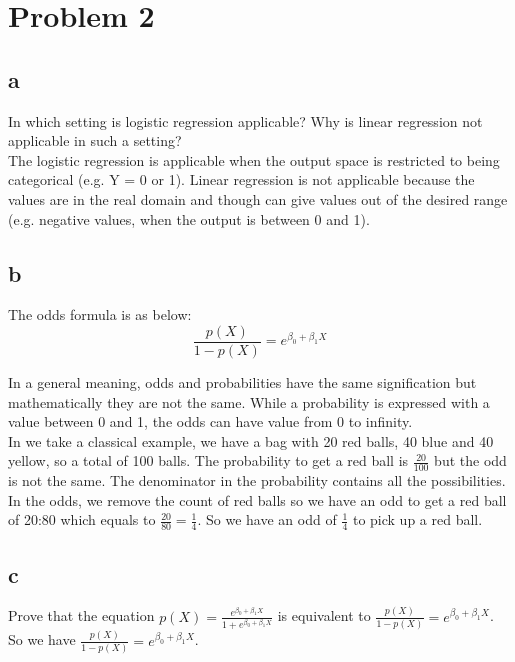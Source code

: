 \section*{Problem 2}

\subsection*{a}
In which setting is logistic regression applicable? Why is linear regression not applicable in such a setting?\\

The logistic regression is applicable when the output space is restricted to being categorical (e.g. Y = 0 or 1). Linear regression is not applicable because the values are in the real domain and though can give values out of the desired range (e.g. negative values, when the output is between 0 and 1). 

\subsection*{b}
The odds formula is as below: 
\[ \frac{p(X)}{1 - p(X)} = e^{\beta_0 + \beta_1 X} \]

In a general meaning, odds and probabilities have the same signification but mathematically they are not the same. While a probability is expressed with a value between 0 and 1, the odds can have value from 0 to infinity. \\

In we take a classical example, we have a bag with 20 red balls, 40 blue and 40 yellow, so a total of 100 balls. The probability to get a red ball is $\frac{20}{100}$ but the odd is not the same. The denominator in the probability contains all the possibilities. In the odds, we remove the count of red balls so we have an odd to get a red ball of 20:80 which equals to $\frac{20}{80} = \frac{1}{4}$. So we have an odd of $\frac{1}{4}$ to pick up a red ball.  

\subsection*{c}

Prove that the equation $ p(X) = \frac{e^{\beta_0 + \beta_1 X}}{1 + e^{\beta_0 + \beta_1 X}} $ is equivalent to $\frac{p(X)}{1 - p(X)} = e^{\beta_0 + \beta_1 X}  $.\\

So we have $\frac{p(X)}{1 - p(X)} = e^{\beta_0 + \beta_1 X} $.

